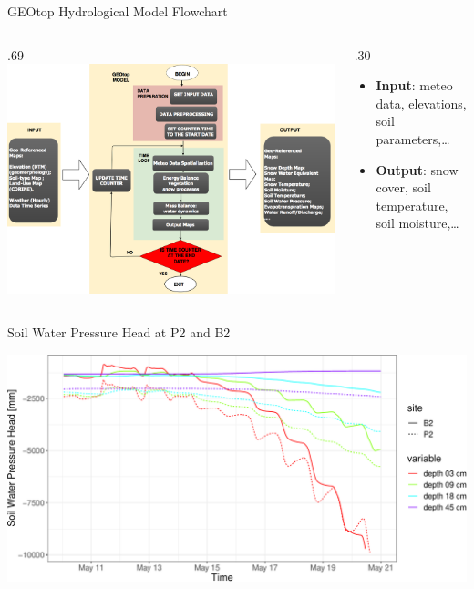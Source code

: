 \documentclass[ignorenonframetext,]{beamer}
\def\begincols{\begin{columns}}
\def\begincol{\begin{column}}
\def\endcol{\end{column}}
\def\endcols{\end{columns}}
\begin{document}
\begin{frame}{GEOtop Hydrological Model Flowchart}

\begincols

\begincol{.69\textwidth}
\includegraphics[width=1.00000\textwidth]{resources/images/geotop_revised.png}\\
\endcol

\begincol{.30\textwidth}

\begin{itemize}
\item
  \textbf{Input}: meteo data, elevations, soil parameters,\ldots{}
\item
  \textbf{Output}: snow cover, soil temperature, soil moisture,\ldots{}
\end{itemize}

\endcol
\endcols

\end{frame}

\begin{frame}{Soil Water Pressure Head at P2 and B2}

\includegraphics{presentation_files/figure-beamer/unnamed-chunk-16-1.pdf}

\end{frame}
\end{document}
